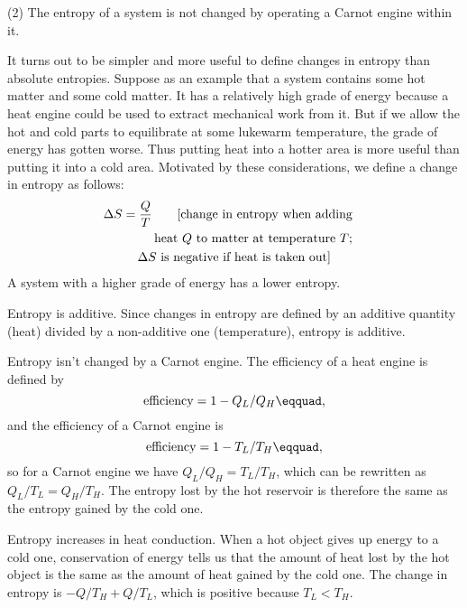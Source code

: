 (2) The entropy of a system is not changed by operating a
Carnot engine within it.

It turns out to be simpler and more useful to define changes
in entropy than absolute entropies. Suppose as an example
that a system contains some hot matter and some cold matter.
It has a relatively high grade of energy because a heat
engine could be used to extract mechanical work from it. But
if we allow the hot and cold parts to equilibrate at some
lukewarm temperature, the grade of energy has gotten worse.
Thus putting heat into a hotter area is more useful than
putting it into a cold area. Motivated by these
considerations, we define a change in entropy as
follows:
\begin{multline*}
        \Delta S  =  \frac{Q}{T}        \qquad \shoveright{\text{[change in entropy when adding}}\\                                                \shoveright{\text{heat $Q$ to matter at temperature $T$;}}\\
                                                {\text{$\Delta S$ is negative if heat is taken out]}}
\end{multline*}
A system with a higher grade of energy has a lower entropy.

\begin{eg}{Entropy is additive.}
Since changes in entropy are defined by an additive quantity
(heat) divided by a non-additive one (temperature), entropy
is additive.
\end{eg}


\begin{eg}{Entropy isn't changed by a Carnot engine.}\label{eg:carnotnoentropychange}
The efficiency of a heat engine is defined by
\begin{equation*}
        \text{efficiency}  =  1 -  Q_L/ Q_H\eqquad,
\end{equation*}
and the efficiency of a Carnot engine is
\begin{equation*}
        \text{efficiency}  =  1 -  T_L/ T_H\eqquad,
\end{equation*}
so for a Carnot engine we have $Q_L/ Q_H =  T_L/ T_H$,
which can be rewritten as
$Q_L/ T_{L} =  Q_{H}/ T_H$.
The entropy lost by the hot reservoir is therefore
the same as the entropy gained by the cold one.
\end{eg}

\begin{eg}{Entropy increases in heat conduction.}\label{eg:s-increase-conduction}
When a hot object gives up energy to a cold one,
conservation of energy tells us that the amount of heat lost
by the hot object is the same as the amount of heat gained
by the cold one. The change in entropy is $- Q/ T_{H}+ Q/ T_L$, which
is positive because $ T_L< T_H$.
\end{eg}


